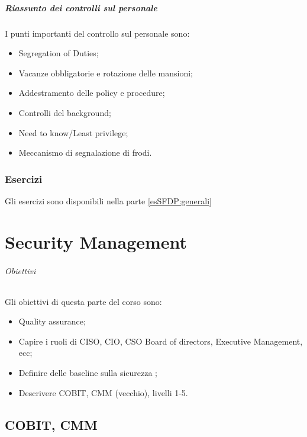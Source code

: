 \subsubsection{Riassunto dei controlli sul personale}

I punti importanti del controllo sul personale sono:
\begin{itemize}
\item Segregation of Duties;
\item Vacanze obbligatorie e rotazione delle mansioni;
\item Addestramento delle policy e procedure;
\item Controlli del background;
\item Need to know/Least privilege;
\item Meccanismo di segnalazione di frodi.
\end{itemize}

\section{Esercizi}

Gli esercizi sono disponibili nella parte \ref{esSFDP:generali}

\part{Security Management}
\label{SM}

\paragraph{Obiettivi}

Gli obiettivi di questa parte del corso sono:
\begin{itemize}
\item Quality assurance;
\item Capire i ruoli di CISO, CIO, CSO Board of directors, Executive 
Management, ecc;
\item Definire delle baseline sulla sicurezza ;
\item Descrivere COBIT, CMM (vecchio), livelli 1-5.
\end{itemize}

\chapter{COBIT, CMM}

